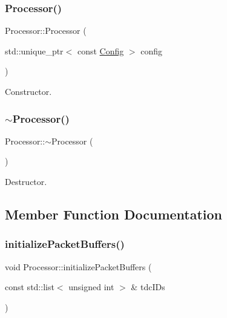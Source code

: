 \subsubsection{\texorpdfstring{Processor()}{Processor()}}
{\footnotesize\ttfamily Processor\+::\+Processor (\begin{DoxyParamCaption}\item[{std\+::unique\+\_\+ptr$<$ const \hyperlink{class_config}{Config} $>$}]{config }\end{DoxyParamCaption})}



Constructor. 

\mbox{\label{class_processor_acf37952c5b420d4e903a512571678692}} 
\subsubsection{\texorpdfstring{$\sim$\+Processor()}{~Processor()}}
{\footnotesize\ttfamily Processor\+::$\sim$\+Processor (\begin{DoxyParamCaption}{ }\end{DoxyParamCaption})}



Destructor. 



\subsection{Member Function Documentation}
\mbox{\label{class_processor_aa9ad1e9d6f3d217e23649e42cd07de90}} 
\subsubsection{\texorpdfstring{initialize\+Packet\+Buffers()}{initializePacketBuffers()}}
{\footnotesize\ttfamily void Processor\+::initialize\+Packet\+Buffers (\begin{DoxyParamCaption}\item[{const std\+::list$<$ unsigned int $>$ \&}]{tdc\+I\+Ds }\end{DoxyParamCaption})\hspace{0.3cm}{\ttfamily [private]}}



